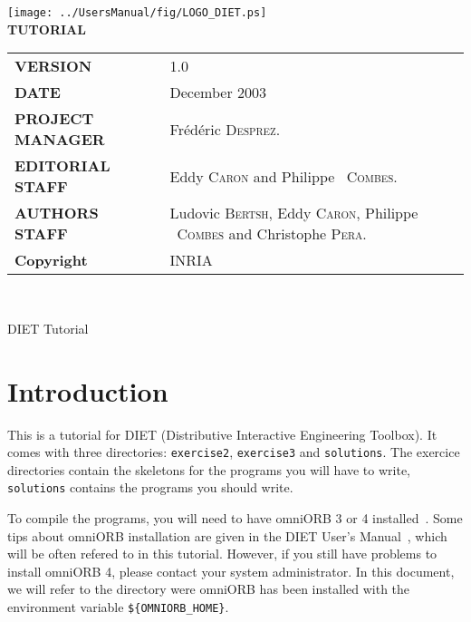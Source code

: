 \documentclass[11pt,a4paper]{article}
\begin{document}

\thispagestyle{empty}
\vspace*{3cm}
\vspace*{3cm}

\begin{center}
\texttt{[image: ../UsersManual/fig/LOGO\_DIET.ps]}\\[2ex]
\textbf{\Huge TUTORIAL\\[2ex]}
\end{center}

\vfill


\noindent
\small{
\begin{tabular}{ll}
  \textbf{VERSION}  & 1.0\\
  \textbf{DATE}     & December 2003\\
  \textbf{PROJECT MANAGER}  & Fr\'ed\'eric \textsc{Desprez}.\\
  \textbf{EDITORIAL STAFF}  & Eddy \textsc{Caron} and Philippe ~\textsc{Combes}.\\
  \textbf{AUTHORS STAFF}    & 
\begin{minipage}[t]{12cm}
  Ludovic \textsc{Bertsh}, Eddy \textsc{Caron}, Philippe ~\textsc{Combes} and Christophe \textsc{Pera}.
\end{minipage} \\
  \textbf{Copyright}& INRIA
\end{tabular}\\
}

\newpage



\begin{center}
{\Huge DIET Tutorial \par}
\end{center}

\section{Introduction}

This is a tutorial for DIET (Distributive Interactive Engineering
Toolbox). It comes with three directories: \texttt{exercise2},
\texttt{exercise3} and \texttt{solutions}. The exercice directories
contain the skeletons for the programs you will have to write,
\texttt{solutions} contains the programs you should write.

To compile the programs, you will need to have omniORB 3 or 4
installed~\cite{ref:UMOmniORB}. Some tips about omniORB installation
are given in the DIET User's Manual~\cite{UMDIET}, which will be often
refered to in this tutorial.  However, if you still have problems to
install omniORB 4, please contact your system administrator.  In this
document, we will refer to the directory were omniORB has been
installed with the environment variable \texttt{\$\{OMNIORB\_HOME\}}.
\end{document}
